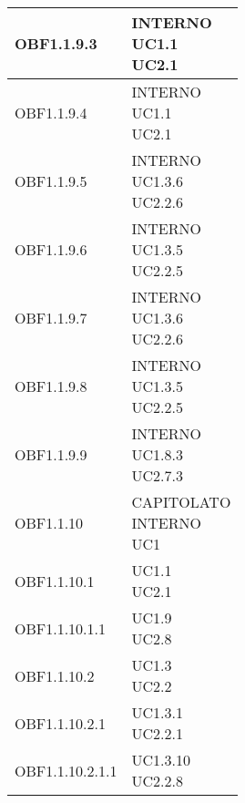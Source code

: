 \documentclass{scalatekids-article}
\begin{document}
\begin{longtable}[H]{|p{5.5cm}|p{5.5cm}|}
  \hline
  OBF1.1.9.3 & \multiLineCell[t]{INTERNO\\UC1.1\\UC2.1\\}\\
  \hline
  OBF1.1.9.4 & \multiLineCell[t]{INTERNO\\UC1.1\\UC2.1\\}\\
  \hline
  OBF1.1.9.5 & \multiLineCell[t]{INTERNO\\UC1.3.6\\UC2.2.6\\}\\
  \hline
  OBF1.1.9.6 & \multiLineCell[t]{INTERNO\\UC1.3.5\\UC2.2.5\\}\\
  \hline
  OBF1.1.9.7 & \multiLineCell[t]{INTERNO\\UC1.3.6\\UC2.2.6\\}\\
  \hline
  OBF1.1.9.8 & \multiLineCell[t]{INTERNO\\UC1.3.5\\UC2.2.5\\}\\
  \hline
  OBF1.1.9.9 & \multiLineCell[t]{INTERNO\\UC1.8.3\\UC2.7.3\\}\\
  \hline
  OBF1.1.10 & \multiLineCell[t]{CAPITOLATO\\INTERNO\\UC1\\}\\
  \hline
  OBF1.1.10.1 & \multiLineCell[t]{UC1.1\\UC2.1\\}\\
  \hline
  OBF1.1.10.1.1 & \multiLineCell[t]{UC1.9\\UC2.8\\}\\
  \hline
  OBF1.1.10.2 & \multiLineCell[t]{UC1.3\\UC2.2\\}\\
  \hline
  OBF1.1.10.2.1 & \multiLineCell[t]{UC1.3.1\\UC2.2.1\\}\\
  \hline
  OBF1.1.10.2.1.1 & \multiLineCell[t]{UC1.3.10\\UC2.2.8\\}\\

\end{longtable}
\end{document}
